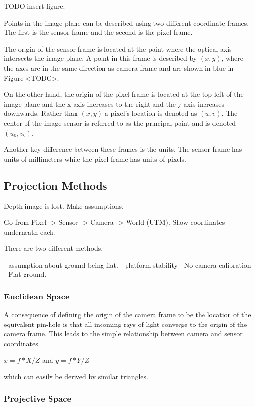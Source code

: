  TODO insert figure.  

 Points in the image plane can be described using two different coordinate frames.  The first is the sensor frame and the second is the pixel frame.  
 
 The origin of the sensor frame is located at the point where the optical axis intersects the image plane.  A point in this frame is described by $(x,y)$, where the axes are in the same direction as camera frame and are shown in blue in Figure <TODO>.  
 
 On the other hand, the origin of the pixel frame is located at the top left of the image plane and the x-axis increases to the right and the y-axis increases downwards.  Rather than $(x,y)$ a pixel's location is denoted as $(u,v)$.  The center of the image sensor is referred to as the principal point and is denoted $(u_0,v_0)$.
 
 Another key difference between these frames is the units.  The sensor frame has units of millimeters while the pixel frame has units of pixels.

 \subsection{Projection Methods}

 Depth image is lost.  Make assumptions.  
 
 Go from Pixel -> Sensor -> Camera -> World (UTM).  Show coordinates underneath each. 
 
 There are two different methods.   
 
 - assumption about ground being flat. 
 - platform stability
 - No camera calibration
 - Flat ground.
 
 \subsubsection{Euclidean Space}
  
 A consequence of defining the origin of the camera frame to be the location of the equivalent pin-hole is that all incoming rays of light converge to the origin of the camera frame.  This leads to the simple relationship between camera and sensor coordinates  
 
 $x=f*X/Z$  and $y=f*Y/Z$

 which can easily be derived by similar triangles.

 \subsubsection{Projective Space}